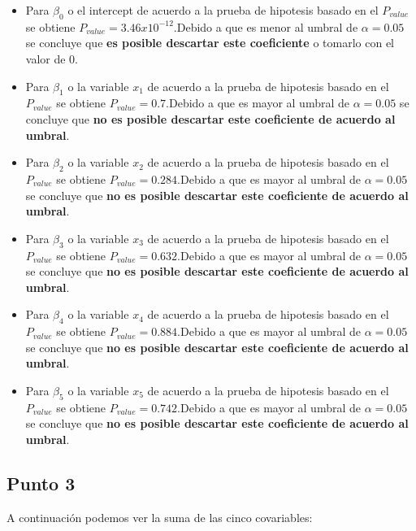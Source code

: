 \documentclass[a4paper]{article}
\begin{document}
\begin{itemize}
    \item  Para $\beta_{0}$ o el intercept de acuerdo a la prueba de hipotesis basado en el $P_{value}$ se obtiene $P_{value}=3.46x10^{-12}$.Debido a que es menor al umbral de $\alpha =0.05$ se concluye que \textbf{es posible descartar este coeficiente} o tomarlo con el valor de 0.
     \item  Para $\beta_{1}$ o la variable $x_1$ de acuerdo a la prueba de hipotesis basado en el $P_{value}$ se obtiene $P_{value}=0.7$.Debido a que es mayor al umbral de $\alpha =0.05$ se concluye que \textbf{no es posible descartar este coeficiente de acuerdo al umbral}.
     \item  Para $\beta_{2}$ o la variable $x_2$ de acuerdo a la prueba de hipotesis basado en el $P_{value}$ se obtiene $P_{value}=0.284$.Debido a que es mayor al umbral de $\alpha =0.05$ se concluye que \textbf{no es posible descartar este coeficiente de acuerdo al umbral}.
     \item  Para $\beta_{3}$ o la variable $x_3$ de acuerdo a la prueba de hipotesis basado en el $P_{value}$ se obtiene $P_{value}=0.632$.Debido a que es mayor al umbral de $\alpha =0.05$ se concluye que \textbf{no es posible descartar este coeficiente de acuerdo al umbral}.
     \item  Para $\beta_{4}$ o la variable $x_4$ de acuerdo a la prueba de hipotesis basado en el $P_{value}$ se obtiene $P_{value}=0.884$.Debido a que es mayor al umbral de $\alpha =0.05$ se concluye que \textbf{no es posible descartar este coeficiente de acuerdo al umbral}.
     \item  Para $\beta_{5}$ o la variable $x_5$ de acuerdo a la prueba de hipotesis basado en el $P_{value}$ se obtiene $P_{value}=0.742$.Debido a que es mayor al umbral de $\alpha =0.05$ se concluye que \textbf{no es posible descartar este coeficiente de acuerdo al umbral}.
\end{itemize}


\subsection{Punto 3}

A continuación podemos ver la suma de las cinco covariables:
\end{document}
